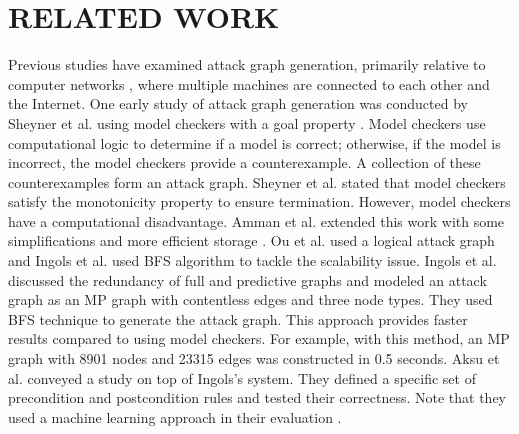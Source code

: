 \section{RELATED WORK}
\label{chap:related_work}

Previous studies have examined attack graph generation, primarily relative to computer networks \cite{ingols2006practical, sheyner2002automated, ritchey2000using, ou2006scalable}, where multiple machines are connected to each other and the Internet. %
One early study of attack graph generation was conducted by Sheyner et al. using model checkers with a goal property \cite{sheyner2002automated}. Model checkers use computational logic to determine if a model is correct; otherwise, if the model is incorrect, the model checkers provide a counterexample. A collection of these counterexamples form an attack graph. Sheyner et al. stated that model checkers satisfy the monotonicity property to ensure termination. However, model checkers have a computational disadvantage. %
 Amman et al. extended this work with some simplifications and more efficient storage \cite{ritchey2000using}. Ou et al. used a logical attack graph \cite{ou2006scalable} and Ingols et al. \cite{ingols2006practical} used BFS algorithm to tackle the scalability issue. Ingols et al. discussed the redundancy of full and predictive graphs and modeled an attack graph as an MP graph with contentless edges and three node types. They used BFS technique to generate the attack graph. This approach provides faster results compared to using model checkers. For example, with this method, an MP graph with 8901 nodes and 23315 edges was constructed in 0.5 seconds. Aksu et al. conveyed a study on top of Ingols's system. They defined a specific set of precondition and postcondition rules and tested their correctness. Note that they used a machine learning approach in their evaluation \cite{aksu2018automated}.

